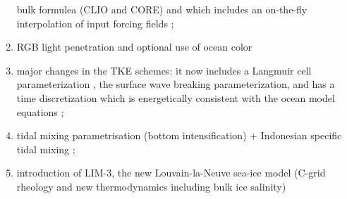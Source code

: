 \documentclass[NEMO_book]{subfiles}
\begin{document}
\begin{enumerate}
bulk formulea (CLIO and CORE) and which includes an on-the-fly interpolation of input forcing fields ;
\item RGB light penetration and optional use of ocean color 
\item major changes in the TKE schemes: it now includes a Langmuir cell parameterization  \citep{Axell_JGR02}, 
the \citet{Mellor_Blumberg_JPO04} surface wave breaking parameterization, and has a time discretization 
which is energetically consistent with the ocean model equations \citep{Burchard_OM02, Marsaleix_al_OM08}; 
\item tidal mixing parametrisation (bottom intensification) + Indonesian specific tidal mixing \citep{Koch-Larrouy_al_GRL07}; 
\item introduction of LIM-3, the new Louvain-la-Neuve sea-ice model (C-grid rheology and
new thermodynamics including bulk ice salinity) \citep{Vancoppenolle_al_OM09a, Vancoppenolle_al_OM09b}
\end{enumerate}
\end{document}
